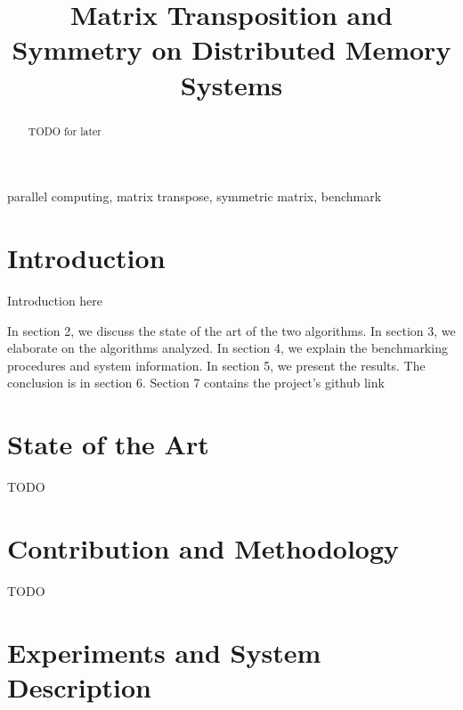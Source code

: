 \documentclass[conference]{IEEEtran}
\begin{document}
\title{Matrix Transposition and Symmetry on Distributed Memory Systems\\
}

\author{
}

\maketitle

\begin{abstract}
TODO for later
\end{abstract}

\begin{IEEEkeywords}
parallel computing, matrix transpose, symmetric matrix, benchmark
\end{IEEEkeywords}

\section{Introduction}

Introduction here

In section 2, we discuss the state of the art of the two algorithms.
In section 3, we elaborate on the algorithms analyzed.
In section 4, we explain the benchmarking procedures and system information.
In section 5, we present the results. The conclusion is in section 6. Section 7 contains
the project's github link


\section{State of the Art}

TODO

\section{Contribution and Methodology}

TODO

\section{Experiments and System Description}
\end{document}
